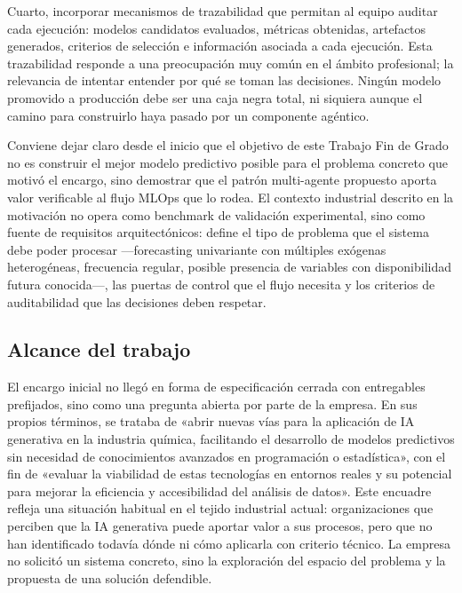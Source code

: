 \documentclass[12pt,a4paper]{article}
\theoremstyle{plain}
\begin{document}
Cuarto, incorporar mecanismos de trazabilidad que permitan al equipo auditar cada ejecución: modelos candidatos evaluados, métricas obtenidas, artefactos generados, criterios de selección e información asociada a cada ejecución. Esta trazabilidad responde a una preocupación muy común en el ámbito profesional; la relevancia de intentar entender por qué se toman las decisiones. Ningún modelo promovido a producción debe ser una caja negra total, ni siquiera aunque el camino para construirlo haya pasado por un componente agéntico. %

Conviene dejar claro desde el inicio que el objetivo de este Trabajo Fin de Grado no es construir el mejor modelo predictivo posible para el problema concreto que motivó el encargo, sino demostrar que el patrón multi-agente propuesto aporta valor verificable al flujo MLOps que lo rodea. El contexto industrial descrito en la motivación no opera como benchmark de validación experimental, sino como fuente de requisitos arquitectónicos: define el tipo de problema que el sistema debe poder procesar ---forecasting univariante con múltiples exógenas heterogéneas, frecuencia regular, posible presencia de variables con disponibilidad futura conocida---, las puertas de control que el flujo necesita y los criterios de auditabilidad que las decisiones deben respetar. %

\subsection{Alcance del trabajo}
\label{sec:alcance}

El encargo inicial no llegó en forma de especificación cerrada con entregables prefijados, sino como una pregunta abierta por parte de la empresa. En sus propios términos, se trataba de «abrir nuevas vías para la aplicación de IA generativa en la industria química, facilitando el desarrollo de modelos predictivos sin necesidad de conocimientos avanzados en programación o estadística», con el fin de «evaluar la viabilidad de estas tecnologías en entornos reales y su potencial para mejorar la eficiencia y accesibilidad del análisis de datos». Este encuadre refleja una situación habitual en el tejido industrial actual: organizaciones que perciben que la IA generativa puede aportar valor a sus procesos, pero que no han identificado todavía dónde ni cómo aplicarla con criterio técnico. La empresa no solicitó un sistema concreto, sino la exploración del espacio del problema y la propuesta de una solución defendible. %
\end{document}
